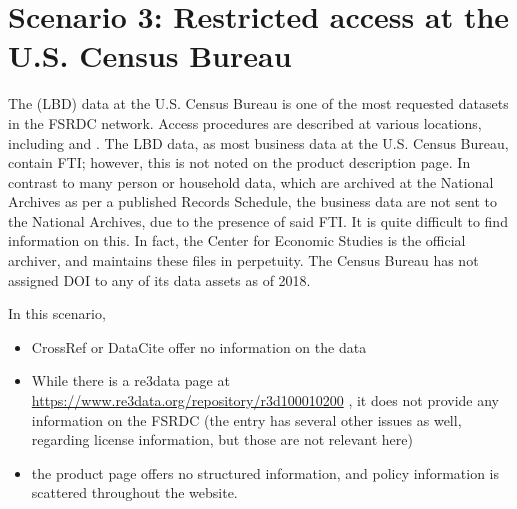 \section{Scenario 3: Restricted access at the U.S. Census Bureau}

The  (LBD) data at the U.S. Census Bureau is one of the most requested datasets in the \ac{FSRDC} network. Access procedures are described at various locations, including  and . The LBD data, as most business data at the U.S. Census Bureau, contain \ac{FTI}; however, this is not noted on the product description page. In contrast to many person or household data, which are archived at the National Archives as per a published Records Schedule, the business data are not sent to the National Archives, due to the presence of said \ac{FTI}. It is quite difficult to find information on this. In fact, the Center for Economic Studies is the official archiver, and maintains these files in perpetuity. The Census Bureau has not assigned \ac{DOI} to any of its data assets as of 2018.


In this scenario, 
\begin{itemize}
	\item CrossRef or DataCite offer no information on the data
	\item While there is a re3data page at \url{https://www.re3data.org/repository/r3d100010200} \parencite{Re3data-uscb}, it does not provide any information on the \ac{FSRDC} (the entry has several other issues as well, regarding license information, but those are not relevant here)
	\item the product page offers no structured information, and policy information is scattered throughout the website.
\end{itemize}